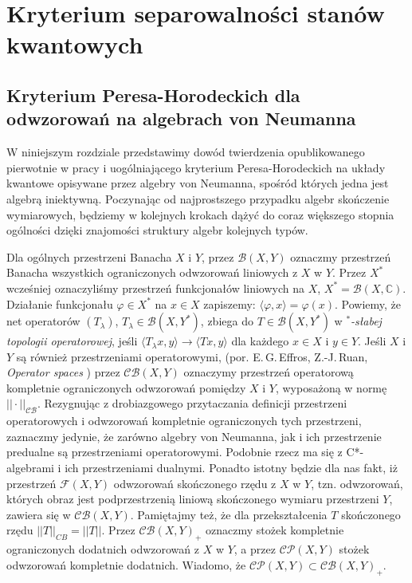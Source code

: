 \chapter{Kryterium separowalności stanów kwantowych}
\label{chp:PHcrit}
\section{Kryterium Peresa-Horodeckich dla odwzorowań na algebrach von Neumanna}
W niniejszym rozdziale przedstawimy dowód twierdzenia
opublikowanego pierwotnie w pracy \cite{miller2014horodeckis}
i uogólniającego kryterium Peresa-Horodeckich na układy
kwantowe opisywane przez algebry von Neumanna,
spośród których jedna jest algebrą iniektywną.
Poczynając od najprostszego przypadku algebr skończenie wymiarowych,
będziemy w kolejnych krokach dążyć do coraz większego stopnia
ogólności dzięki znajomości struktury algebr kolejnych typów.

\vspace{0.5cm}
Dla ogólnych przestrzeni Banacha $X$ i $Y$, przez
$\mathcal{B}(X,Y)$
oznaczmy przestrzeń Banacha wszystkich ograniczonych odwzorowań
liniowych z $X$ w $Y$.
Przez $X^{*}$ wcześniej oznaczyliśmy przestrzeń funkcjonałów liniowych na $X$,
$X^{*} = \mathcal{B}(X, \mathbb{C})$.
Działanie funkcjonału $\varphi \in X^{*}$ na $x \in X$
zapiszemy: $\langle  \varphi , x \rangle = \varphi(x)$.
Powiemy, że net operatorów $(T_{\lambda})$,
$T_{\lambda} \in \mathcal{B}(X, Y^{*})$, zbiega do
$T \in \mathcal{B}(X, Y^{*})$ w \emph{$^{*}$-słabej topologii operatorowej}, jeśli
\label{page:weakstaroperatortop}
$\langle T_{\lambda} x, y \rangle \rightarrow \langle Tx, y \rangle$
dla każdego $x \in X$ i $y \in Y$.
Jeśli $X$ i $Y$ są również przestrzeniami operatorowymi,
(por. E.\,G.\,Effros, Z.-J.\,Ruan, \emph{Operator spaces} \cite{Effros2000})
przez $\mathcal{CB}(X,Y)$ oznaczymy przestrzeń operatorową
kompletnie ograniczonych odwzorowań pomiędzy $X$ i $Y$,
wyposażoną w normę
$|| \cdot ||_{\mathcal{CB}}$.
Rezygnując z drobiazgowego przytaczania definicji przestrzeni operatorowych
i odwzorowań kompletnie ograniczonych tych przestrzeni,
zaznaczmy jedynie, że zarówno algebry von Neumanna, jak i
ich przestrzenie predualne są przestrzeniami operatorowymi.
Podobnie rzecz ma się z C*-algebrami i ich przestrzeniami dualnymi.
Ponadto istotny będzie dla nas fakt, iż
przestrzeń $\mathcal{F}(X,Y)$
odwzorowań skończonego rzędu z $X$ w $Y$,
tzn. odwzorowań, których obraz jest podprzestrzenią liniową skończonego wymiaru
przestrzeni $Y$, zawiera się w $\mathcal{CB}(X,Y)$.
Pamiętajmy też, że dla przekształcenia $T$ skończonego rzędu
$||T||_{CB} = ||T||$.
Przez $\mathcal{CB}(X,Y)_{+}$
oznaczmy stożek kompletnie ograniczonych dodatnich odwzorowań
z $X$ w $Y$, a przez $\mathcal{CP}(X,Y)$ stożek odwzorowań kompletnie dodatnich.
Wiadomo, że $\mathcal{CP}(X,Y) \subset \mathcal{CB}(X,Y)_{+}$.

